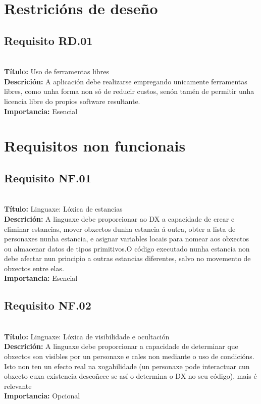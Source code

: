\section{Restricións de deseño}

\subsection{Requisito RD.01}~\\
{\bf Título:} Uso de ferramentas libres\\
{\bf Descrición:} A aplicación debe realizarse empregando unicamente ferramentas libres, como unha forma non só de reducir custos, senón tamén de permitir unha licencia libre do propios software resultante.\\
{\bf Importancia:} Esencial


\section{Requisitos non funcionais}

\subsection{Requisito NF.01}~\\
{\bf Título:} Linguaxe: Lóxica de estancias\\
{\bf Descrición:} A linguaxe debe proporcionar ao DX a capacidade de crear e eliminar estancias, mover obxectos dunha estancia á outra, obter a lista de personaxes nunha estancia, e asignar variables locais para nomear aos obxectos ou almacenar datos de tipos primitivos.O código executado nunha estancia non debe afectar nun principio a outras estancias diferentes, salvo no movemento de obxectos entre elas.\\
{\bf Importancia:} Esencial

\subsection{Requisito NF.02}~\\
{\bf Título:} Linguaxe: Lóxica de visibilidade e ocultación\\
{\bf Descrición:} A linguaxe debe proporcionar a capacidade de determinar que obxectos son visibles por un personaxe e cales non mediante o uso de condicións. Isto non ten un efecto real na xogabilidade (un personaxe pode interactuar cun obxecto cuxa existencia descoñece se así o determina o DX no seu código), mais é relevante \\
{\bf Importancia:} Opcional


